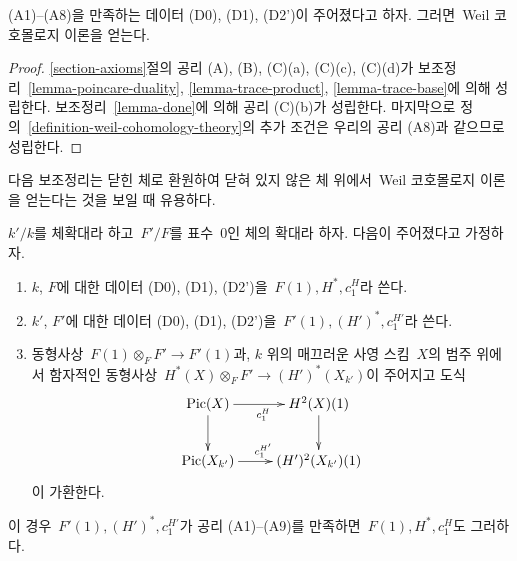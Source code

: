 \begin{proposition}
\label{proposition-get-weil}
(A1)--(A8)을 만족하는 데이터 (D0), (D1), (D2')이 주어졌다고 하자.
그러면\  Weil 코호몰로지 이론을 얻는다.
\end{proposition}

\begin{proof}
\ref{section-axioms}절의 공리 (A), (B), (C)(a), (C)(c), (C)(d)가
보조정리\  \ref{lemma-poincare-duality}, \ref{lemma-trace-product},
\ref{lemma-trace-base}에 의해 성립한다. 보조정리\ 
\ref{lemma-done}에 의해 공리 (C)(b)가 성립한다. 마지막으로 정의\ 
\ref{definition-weil-cohomology-theory}의 추가 조건은 우리의 공리
(A8)과 같으므로 성립한다.
\end{proof}

\noindent
다음 보조정리는 닫힌 체로 환원하여 닫혀 있지 않은 체 위에서\  Weil
코호몰로지 이론을 얻는다는 것을 보일 때 유용하다.

\begin{lemma}
\label{lemma-check-over-extension}
$k'/k$를 체확대라 하고\  $F'/F$를 표수\  $0$인 체의 확대라 하자.
다음이 주어졌다고 가정하자.
\begin{enumerate}
\item $k$, $F$에 대한 데이터 (D0), (D1), (D2')을\ 
$F(1), H^*, c_1^H$라 쓴다.
\item $k'$, $F'$에 대한 데이터 (D0), (D1), (D2')을\ 
$F'(1), (H')^*, c_1^{H'}$라 쓴다.
\item 동형사상\  $F(1) \otimes_F F' \to F'(1)$과, $k$ 위의 매끄러운
사영 스킴\  $X$의 범주 위에서 함자적인 동형사상\ 
$H^*(X) \otimes_F F' \to (H')^*(X_{k'})$이 주어지고 도식
$$
\xymatrix{
\Pic(X) \ar[r]_{c_1^H} \ar[d] & H^2(X)(1) \ar[d] \\
\Pic(X_{k'}) \ar[r]^{c_1^{H'}} & (H')^2(X_{k'})(1)
}
$$
이 가환한다.
\end{enumerate}
이 경우\  $F'(1), (H')^*, c_1^{H'}$가 공리 (A1)--(A9)를 만족하면\ 
$F(1), H^*, c_1^H$도 그러하다.
\end{lemma}

